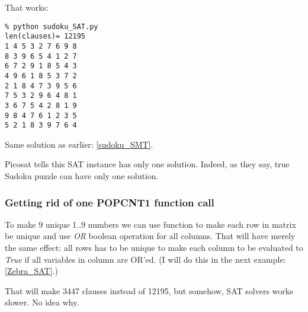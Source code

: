 That works:

\begin{lstlisting}
% python sudoku_SAT.py
len(clauses)= 12195
1 4 5 3 2 7 6 9 8
8 3 9 6 5 4 1 2 7
6 7 2 9 1 8 5 4 3
4 9 6 1 8 5 3 7 2
2 1 8 4 7 3 9 5 6
7 5 3 2 9 6 4 8 1
3 6 7 5 4 2 8 1 9
9 8 4 7 6 1 2 3 5
5 2 1 8 3 9 7 6 4
\end{lstlisting}

Same solution as earlier: \ref{sudoku_SMT}.

Picosat tells this SAT instance has only one solution.
Indeed, as they say, true Sudoku puzzle can have only one solution.

\subsubsection{Getting rid of one POPCNT1 function call}
\label{OR_in_POPCNT1}

To make 9 unique 1..9 numbers we can use  function to make each row in matrix be unique and
use \textit{OR} boolean operation for all columns.
That will have merely the same effect: all rows has to be unique to make each column to be evaluated
to \textit{True} if all variables in column are OR'ed.
(I will do this in the next example: \ref{Zebra_SAT}.)

That will make 3447 clauses instead of 12195, but somehow, SAT solvers works slower. No idea why.


